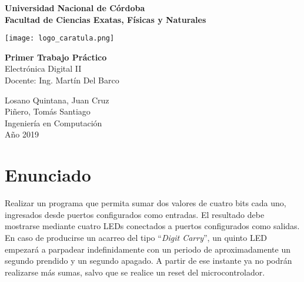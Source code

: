 \documentclass[12pt,a4paper]{article}
\renewcommand{\baselinestretch}{1} %
\begin{document}
\begin{titlepage}
    \begin{center}
        \vspace*{1cm}
        
        \Large
        \textbf{Universidad Nacional de Córdoba\\
        		Facultad de Ciencias Exatas, Físicas y Naturales}
        
        \vspace{0.5cm}
        \texttt{[image: logo\_caratula.png]}
        
        \vspace{1.5cm}
        
        \textbf{Primer Trabajo Práctico}\\
        Electrónica Digital II\\
        Docente: Ing. Martín Del Barco
        
        \vfill  
        
        \vspace{0.8cm}
        

        
        \Large
        Losano Quintana, Juan Cruz\\
        Piñero, Tomás Santiago\\
        Ingeniería en Computación\\
        Año 2019\\
        
        
    \end{center}
\end{titlepage}


\setcounter{secnumdepth}{1}
\setcounter{tocdepth}{4}
\tableofcontents


\newpage
\renewcommand{\baselinestretch}{1}
\setlength{\parskip}{0.5em}

\section{Enunciado}
	Realizar un programa que permita sumar dos valores de cuatro bits cada uno, ingresados desde puertos configurados como entradas. El resultado debe mostrarse mediante cuatro LEDs conectados a puertos configurados como salidas. En caso de producirse un acarreo del tipo ``\emph{Digit Carry}'', un quinto LED empezará a parpadear indefinidamente con un periodo de aproximadamente un segundo prendido y un segundo apagado. A partir de ese instante ya no podrán realizarse más sumas, salvo que se realice un reset del microcontrolador.
	
\end{document}
